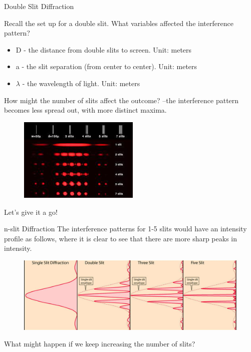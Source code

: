 \documentclass[../Main.tex]{subfiles}
\begin{document}
\author{Diffraction} %
\date{Year 1 Topic 18} %


\begin{frame}{Double Slit Diffraction}
\begin{multicols}{2}
    Recall the set up for a double slit. What variables affected the interference pattern? 
    \begin{itemize}
        \item D - the distance from double slits to screen. Unit: meters
        \item a - the slit separation (from center to center). Unit: meters
        \item $\lambda$ - the wavelength of light. Unit: meters
    \end{itemize}
    How might the number of slits affect the outcome? %
    --the interference pattern becomes less spread out, with more distinct maxima.
    \columnbreak
    \begin{figure}
        \centering
        \includegraphics[height=4cm]{Waves_Images/7slitgrating.jpeg}
    \end{figure}
    Let's give it a go!
    \end{multicols}
\end{frame}

\begin{frame}{n-slit Diffraction}
The interference patterns for 1-5 slits would have an intensity profile as follows, where it is clear to see that there are more sharp peaks in intensity.
    \begin{figure}
        \centering
        \includegraphics[width=\textwidth]{Waves_Images/5slitgraph.jpg}
    \end{figure}
    What might happen if we keep increasing the number of slits?
\end{frame}
\end{document}
